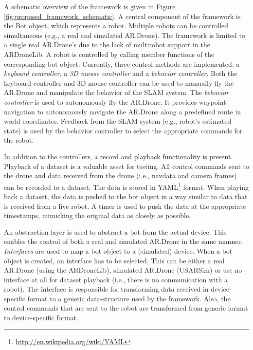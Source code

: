 A schematic overview of the framework is given in Figure \ref{fig:proposed_framework_schematic}.
A central component of the framework is the Bot object, which represents a robot.
Multiple robots can be controlled simultaneous (e.g., a real and simulated AR.Drone).
The framework is limited to a single real AR.Drone's due to the lack of multirobot support in the ARDroneLib.
A robot is controlled by calling member functions of the corresponding bot object.
Currently, three control methods are implemented: a \textit{keyboard controller}, a \textit{3D mouse controller} and a \textit{behavior controller}.
Both the keyboard controller and 3D mouse controller can be used to manually fly the AR.Drone and manipulate the behavior of the SLAM system.
The \textit{behavior controller} is used to autonomously fly the AR.Drone. 
It provides waypoint navigation to autonomously navigate the AR.Drone along a predefined route in world coordinates.
Feedback from the SLAM system (e.g., robot's estimated state) is used by the behavior controller to select the appropriate commands for the robot.

In addition to the controllers, a record and playback functionality is present.
Playback of a dataset is a valuable asset for testing.
All control commands sent to the drone and data received from the drone (i.e., navdata and camera frames) can be recorded to a dataset.
The data is stored in YAML\footnote{\url{http://en.wikipedia.org/wiki/YAML}} format.
When playing back a dataset, the data is pushed to the bot object in a way similar to data that is received from a live robot.
A timer is used to push the data at the appropriate timestamps, mimicking the original data as closely as possible.

An abstraction layer is used to abstract a bot from the actual device.
This enables the control of both a real and simulated AR.Drone in the same manner.
\textit{Interfaces} are used to map a bot object to a (simulated) device.
When a bot object is created, an interface has to be selected.
This can be either a real AR.Drone (using the ARDroneLib), simulated AR.Drone (USARSim) or use no interface at all for dataset playback (i.e., there is no communication with a robot).
The interface is responsible for transforming data received in device-specific format to a generic data-structure used by the framework.
Also, the control commands that are sent to the robot are transformed from generic format to device-specific format.

